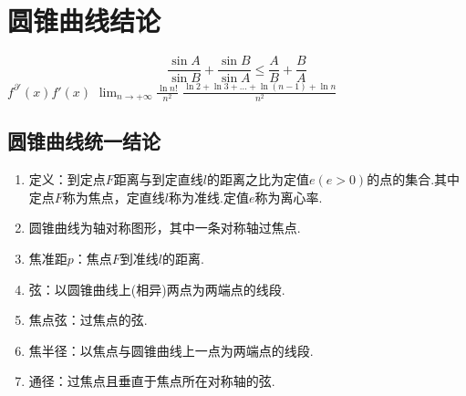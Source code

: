   \Teach{}

  \newtheorem*{Theorem}{定理}
  \makefront
\vspace{-1.5em}

\section{圆锥曲线结论}
\[\frac{\sin A}{\sin B}+\frac{\sin B}{\sin A} \leqslant \frac{A}{B}+\frac{B}{A}
    \]
$f^{\partial \prime}(x)f'(x)$
$\lim_{n\to +\infty}\frac{\ln{n!}}{n^2}$
$\frac{\ln{2}+\ln{3}+\ldots+\ln{(n-1)}+\ln{n}}{n^2}$

    \subsection{圆锥曲线统一结论}
        \begin{enumerate}
            \item 定义：到定点$F$距离与到定直线$l$的距离之比为定值$e(e>0)$的点的集合.其中定点$F$称为焦点，定直线$l$称为准线.定值$e$称为离心率.
            \item 圆锥曲线为轴对称图形，其中一条对称轴过焦点.
            \item 焦准距$p$：焦点$F$到准线$l$的距离.
            \item 弦：以圆锥曲线上(相异)两点为两端点的线段.
            \item 焦点弦：过焦点的弦.
            \item 焦半径：以焦点与圆锥曲线上一点为两端点的线段.
            \item 通径：过焦点且垂直于焦点所在对称轴的弦.
        \end{enumerate}

